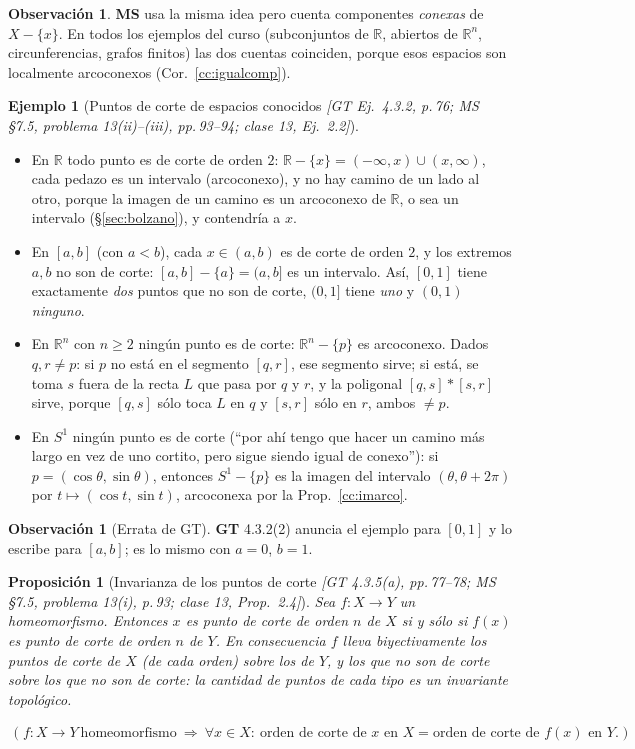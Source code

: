 \documentclass[11pt,a4paper]{article}
\newenvironment{lista}{\leavevmode\begin{itemize}[leftmargin=1.5em,itemsep=1pt,topsep=2pt,parsep=0pt]}{\end{itemize}}
\newcommand{\lgc}[1]{\par\vspace{-3pt}\begin{gather*}\big(\;#1\;\big)\end{gather*}\vspace{-6pt}}
\theoremstyle{definition}
\newtheorem{ejemplo}[definicion]{Ejemplo}
\newtheorem{observacion}[definicion]{Observación}
\theoremstyle{plain}
\newtheorem{proposicion}[definicion]{Proposición}
\newcommand{\fnt}[1]{{\normalfont\small\itshape\color{gray!150!black}[#1]}}
\newcommand{\R}{\mathbb{R}}
\begin{document}
\begin{observacion}
\textbf{MS} usa la misma idea pero cuenta componentes \emph{conexas} de $X-\{x\}$. En todos los ejemplos del curso (subconjuntos de $\R$, abiertos de $\R^n$, circunferencias, grafos finitos) las dos cuentas coinciden, porque esos espacios son localmente arcoconexos (Cor.~\ref{cc:igualcomp}).
\end{observacion}

\begin{ejemplo}[Puntos de corte de espacios conocidos \fnt{GT Ej.\ 4.3.2, p.\,76; MS \S7.5, problema 13(ii)--(iii), pp.\,93--94; clase 13, Ej.\ 2.2}]\label{cc:ejcorte}
\begin{lista}
\item En $\R$ todo punto es de corte de orden $2$: $\R-\{x\}=(-\infty,x)\cup(x,\infty)$, cada pedazo es un intervalo (arcoconexo), y no hay camino de un lado al otro, porque la imagen de un camino es un arcoconexo de $\R$, o sea un intervalo (\S\ref{sec:bolzano}), y contendría a $x$.
\item En $[a,b]$ (con $a<b$), cada $x\in(a,b)$ es de corte de orden $2$, y los extremos $a,b$ no son de corte: $[a,b]-\{a\}=(a,b]$ es un intervalo. Así, $[0,1]$ tiene exactamente \emph{dos} puntos que no son de corte, $(0,1]$ tiene \emph{uno} y $(0,1)$ \emph{ninguno}.
\item En $\R^n$ con $n\ge2$ ningún punto es de corte: $\R^n-\{p\}$ es arcoconexo. Dados $q,r\ne p$: si $p$ no está en el segmento $[q,r]$, ese segmento sirve; si está, se toma $s$ fuera de la recta $L$ que pasa por $q$ y $r$, y la poligonal $[q,s]*[s,r]$ sirve, porque $[q,s]$ sólo toca $L$ en $q$ y $[s,r]$ sólo en $r$, ambos $\ne p$.
\item En $S^1$ ningún punto es de corte (``por ahí tengo que hacer un camino más largo en vez de uno cortito, pero sigue siendo igual de conexo''): si $p=(\cos\theta,\sin\theta)$, entonces $S^1-\{p\}$ es la imagen del intervalo $(\theta,\theta+2\pi)$ por $t\mapsto(\cos t,\sin t)$, arcoconexa por la Prop.~\ref{cc:imarco}.
\end{lista}
\end{ejemplo}

\begin{observacion}[Errata de GT]
\textbf{GT} 4.3.2(2) anuncia el ejemplo para $[0,1]$ y lo escribe para $[a,b]$; es lo mismo con $a=0$, $b=1$.
\end{observacion}

\begin{proposicion}[Invarianza de los puntos de corte \fnt{GT 4.3.5(a), pp.\,77--78; MS \S7.5, problema 13(i), p.\,93; clase 13, Prop.\ 2.4}]\label{cc:invcorte}
Sea $f:X\to Y$ un homeomorfismo. Entonces $x$ es punto de corte de orden $n$ de $X$ si y sólo si $f(x)$ es punto de corte de orden $n$ de $Y$. En consecuencia $f$ lleva biyectivamente los puntos de corte de $X$ (de cada orden) sobre los de $Y$, y los que no son de corte sobre los que no son de corte: la cantidad de puntos de cada tipo es un invariante topológico.
\lgc{f:X\to Y\ \text{homeomorfismo}\ \Rightarrow\ \forall x\in X:\ \text{orden de corte de } x \text{ en } X=\text{orden de corte de } f(x) \text{ en } Y.}
\end{proposicion}
\end{document}
